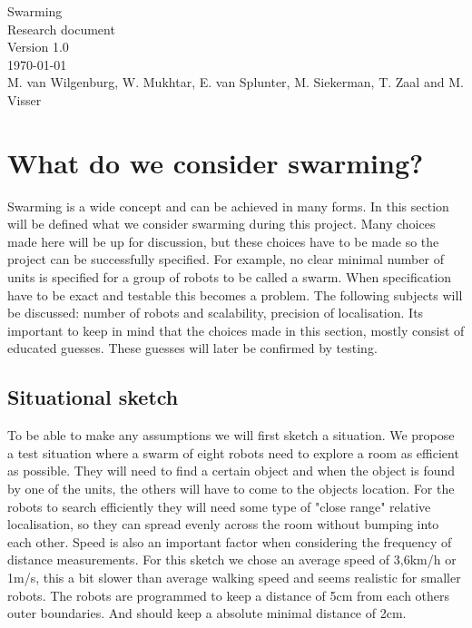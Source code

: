 \documentclass[10pt,a4paper]{article}
\begin{document}
\begin{titlepage}
    \centering
    \vfill
    {\Large

    Swarming\\

   
    {\small Research document}\\
    {\small Version 1.0}\\
    {\small \today}\\
        
        \vskip2cm
        {\small M. van Wilgenburg, W. Mukhtar, E. van Splunter, M. Siekerman, T. Zaal and M. Visser}\\
    }    
    \vfill
    
    \vfill
    \vfill
\end{titlepage}

\newpage

\listoffigures
\newpage

\listoftables
\newpage

\tableofcontents
\newpage

\section{What do we consider swarming?}
Swarming is a wide concept and can be achieved in many forms. In this section will be defined what we consider swarming during this project. Many choices made here will be up for discussion, but these choices have to be made so the project can be successfully specified. For example, no clear minimal number of units is specified for a group of robots to be called a swarm. When specification have to be exact and testable this becomes a problem. The following subjects will be discussed: number of robots and scalability, precision of localisation. Its important to keep in mind that the choices made in this section, mostly consist of educated guesses. These guesses will later be confirmed by testing.

\subsection{Situational sketch}
To be able to make any assumptions we will first sketch a situation. We propose a test situation where a swarm of eight robots need to explore a room as efficient as possible. They will need to find a certain object and when the object is found by one of the units, the others will have to come to the objects location. For the robots to search efficiently they will need some type of "close range" relative localisation, so they can spread evenly across the room without bumping into each other. Speed is also an important factor when considering the frequency of distance measurements. For this sketch we chose an average speed of 3,6km/h or 1m/s, this a bit slower than average walking speed and seems realistic for smaller robots. The robots are programmed to keep a distance of 5cm from each others outer boundaries. And should keep a absolute minimal distance of 2cm.
\end{document}

